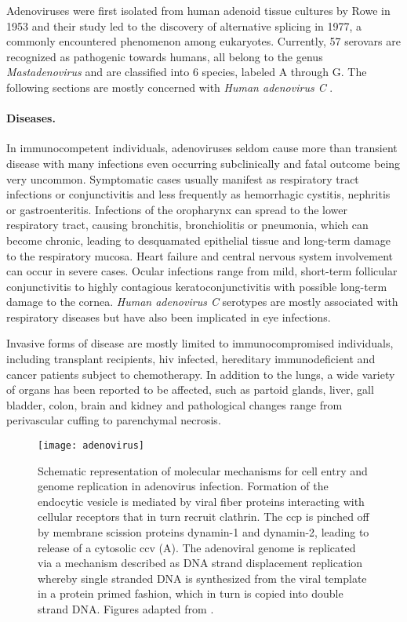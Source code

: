 Adenoviruses were first isolated from human adenoid tissue cultures by Rowe in 1953 and their study led to the discovery of alternative splicing in 1977, a commonly encountered phenomenon among eukaryotes. Currently, 57 serovars are recognized as pathogenic towards humans, all belong to the genus \textit{Mastadenovirus} and are classified into 6 species, labeled A through G. The following sections are mostly concerned with \textit{Human adenovirus C} \citep{Lenaerts2008}.

\paragraph{Diseases.}
In immunocompetent individuals, adenoviruses seldom cause more than transient disease with many infections even occurring subclinically and fatal outcome being very uncommon. Symptomatic cases usually manifest as respiratory tract infections or conjunctivitis and less frequently as hemorrhagic cystitis, nephritis or gastroenteritis. Infections of the oropharynx can spread to the lower respiratory tract, causing bronchitis, bronchiolitis or pneumonia, which can become chronic, leading to desquamated epithelial tissue and long-term damage to the respiratory mucosa. Heart failure and central nervous system involvement can occur in severe cases. Ocular infections range from mild, short-term follicular conjunctivitis to highly contagious keratoconjunctivitis with possible long-term damage to the cornea. \textit{Human adenovirus C} serotypes are mostly associated with respiratory diseases but have also been implicated in eye infections.

Invasive forms of disease are mostly limited to immunocompromised individuals, including transplant recipients, \gls{hiv} infected, hereditary immunodeficient and cancer patients subject to chemotherapy. In addition to the lungs, a wide variety of organs has been reported to be affected, such as partoid glands, liver, gall bladder, colon, brain and kidney and pathological changes range from perivascular cuffing to parenchymal necrosis.

\begin{figure}
  \centering
  \texttt{[image: adenovirus]}
  \caption[Molecular mechanisms of adenovirus infection.]{Schematic representation of molecular mechanisms for cell entry and genome replication in adenovirus infection. Formation of the endocytic vesicle is mediated by viral fiber proteins interacting with cellular receptors that in turn recruit clathrin. The \gls{ccp} is pinched off by membrane scission proteins dynamin-1 and dynamin-2, leading to release of a cytosolic \acrshort{ccv} (A). The adenoviral genome is replicated via a mechanism described as DNA strand displacement replication whereby single stranded DNA is synthesized from the viral template in a protein primed fashion, which in turn is copied into double strand DNA. Figures adapted from \cite{Hulo2011}.}
  \label{fig:adenovirus}
\end{figure}


